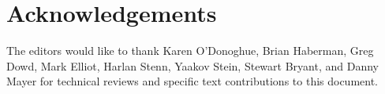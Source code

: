 \chapter{Acknowledgements}

The editors would like to thank Karen O'Donoghue, Brian Haberman,
Greg Dowd, Mark Elliot, Harlan Stenn, Yaakov Stein, Stewart Bryant,
and Danny Mayer for technical reviews and specific text contributions
to this document.
